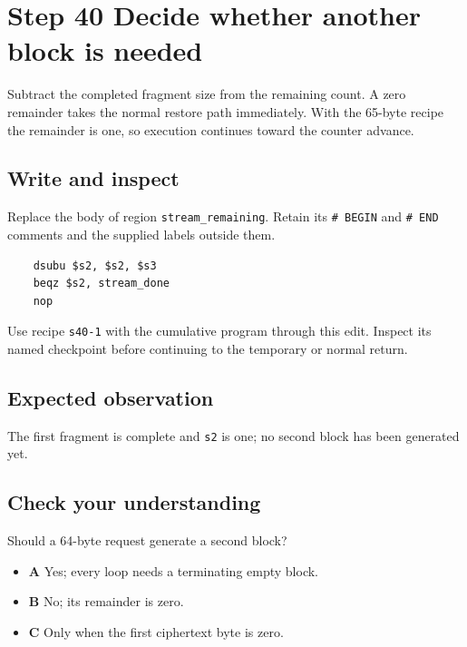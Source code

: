 \section{Step 40 Decide whether another block is needed}\label{chacha-s40}

Subtract the completed fragment size from the remaining count. A zero remainder takes the normal restore path immediately. With the 65-byte recipe the remainder is one, so execution continues toward the counter advance.

\subsection{Write and inspect}
Replace the body of region \texttt{stream\_remaining}. Retain its \texttt{\# BEGIN} and \texttt{\# END} comments and the supplied labels outside them.

\begin{verbatim}
    dsubu $s2, $s2, $s3
    beqz $s2, stream_done
    nop
\end{verbatim}

Use recipe \texttt{s40-1} with the cumulative program through this edit. Inspect its named checkpoint before continuing to the temporary or normal return.

\subsection{Expected observation}
The first fragment is complete and \texttt{s2} is one; no second block has been generated yet.

\subsection{Check your understanding}
Should a 64-byte request generate a second block?

\begin{itemize}
  \item \textbf{A} Yes; every loop needs a terminating empty block.
  \item \textbf{B} No; its remainder is zero.
  \item \textbf{C} Only when the first ciphertext byte is zero.
\end{itemize}
